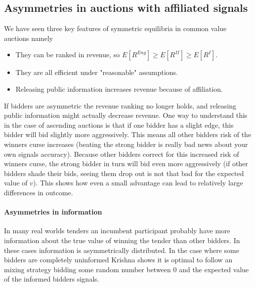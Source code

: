 \subsection{Asymmetries in auctions with affiliated signals}
We have seen three key features of symmetric equilibria in common value auctions namely 
\begin{itemize}
    \item They can be ranked in revenue, so $E[R^{Eng}]\geq E[R^{II}] \geq E[R^I]$.
    \item They are all efficient under "reasonable" assumptions.
    \item Releasing public information increases revenue because of affiliation. 
\end{itemize}
If bidders are asymmetric the revenue ranking no longer holds, and releasing public information might actually decrease revenue. One way to understand this in the case of ascending auctions is that if one bidder has a slight edge, this bidder will bid slightly more aggressively. This means all other bidders risk of the winners curse increases (beating the strong bidder is really bad news about your own signals accuracy). Because other bidders correct for this increased risk of winners curse, the strong bidder in turn will bid even more aggressively (if other bidders shade their bids, seeing them drop out is not that bad for the expected value of $v$). This shows how even a small advantage can lead to relatively large differences in outcome. 

\paragraph{Asymmetries in information} In many real worlds tenders an incumbent participant probably have more information about the true value of winning the tender than other bidders. In these cases information is asymmetrically distributed. In the case where some bidders are completely uninformed Krishna shows it is optimal to follow an mixing strategy bidding some random number between 0 and the expected value of the informed bidders signals. 

